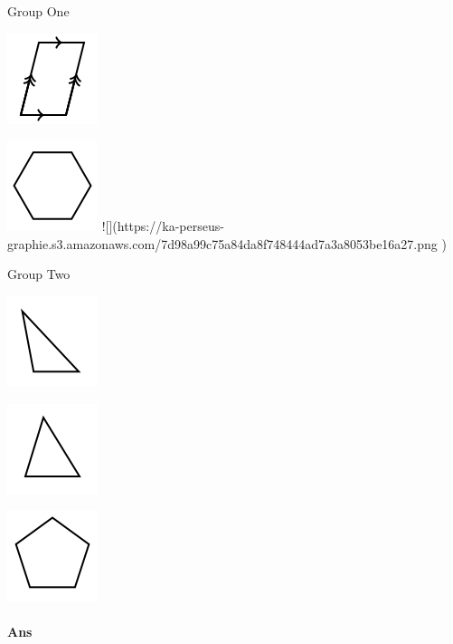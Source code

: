 \documentclass[twocolumn,10pt]{article}
\def\shrinkfactor{0.55}
\begin{document}
Group One 


\includegraphics[scale=\shrinkfactor]{figures/feaa75a1e077e1d8ea6873bc2a4aa206d3c95598.png}

\includegraphics[scale=\shrinkfactor]{figures/0245164f3f4897772e76d361f955075a80732b03.png}
![](https://ka-perseus-graphie.s3.amazonaws.com/7d98a99c75a84da8f748444ad7a3a8053be16a27.png
)


Group Two


\includegraphics[scale=\shrinkfactor]{figures/2d844a51b839d81f30ea0fd7869869c78159abd0.png}

\includegraphics[scale=\shrinkfactor]{figures/ee7f87a00acb47dec4f2b2eed9a6741b21afc47d.png}

\includegraphics[scale=\shrinkfactor]{figures/498a6b09730fdba2360826c138eeee142e8cccc1.png}



\paragraph{Ans} 
\end{document}
